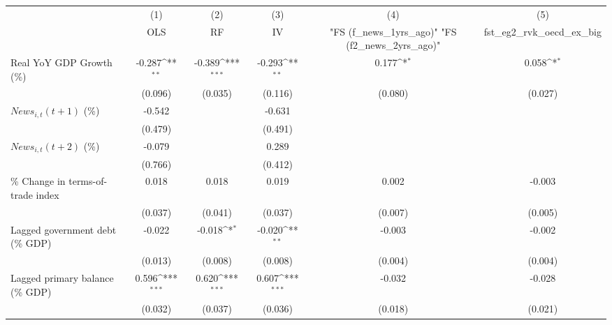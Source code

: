 {
\def\sym#1{\ifmmode^{#1}\else\(^{#1}\)\fi}
\begin{tabular}{l*{5}{c}}
\toprule
                    &\multicolumn{1}{c}{(1)}&\multicolumn{1}{c}{(2)}&\multicolumn{1}{c}{(3)}&\multicolumn{1}{c}{(4)}&\multicolumn{1}{c}{(5)}\\
                    &\multicolumn{1}{c}{OLS}&\multicolumn{1}{c}{RF}&\multicolumn{1}{c}{IV}&\multicolumn{1}{c}{ "FS (f_news_1yrs_ago)"  "FS (f2_news_2yrs_ago)" }&\multicolumn{1}{c}{fst_eg2_rvk_oecd_ex_big}\\
\midrule
Real YoY GDP Growth (\%)&      -0.287\sym{**} &      -0.389\sym{***}&      -0.293\sym{**} &       0.177\sym{*}  &       0.058\sym{*}  \\
                    &     (0.096)         &     (0.035)         &     (0.116)         &     (0.080)         &     (0.027)         \\
\addlinespace
$ News_{i,t}(t+1)$ (\%)&      -0.542         &                     &      -0.631         &                     &                     \\
                    &     (0.479)         &                     &     (0.491)         &                     &                     \\
\addlinespace
$ News_{i,t}(t+2)$ (\%)&      -0.079         &                     &       0.289         &                     &                     \\
                    &     (0.766)         &                     &     (0.412)         &                     &                     \\
\addlinespace
\% Change in terms-of-trade index&       0.018         &       0.018         &       0.019         &       0.002         &      -0.003         \\
                    &     (0.037)         &     (0.041)         &     (0.037)         &     (0.007)         &     (0.005)         \\
\addlinespace
Lagged government debt (\% GDP)&      -0.022         &      -0.018\sym{*}  &      -0.020\sym{**} &      -0.003         &      -0.002         \\
                    &     (0.013)         &     (0.008)         &     (0.008)         &     (0.004)         &     (0.004)         \\
\addlinespace
Lagged primary balance (\% GDP)&       0.596\sym{***}&       0.620\sym{***}&       0.607\sym{***}&      -0.032         &      -0.028         \\
                    &     (0.032)         &     (0.037)         &     (0.036)         &     (0.018)         &     (0.021)         \\

\end{tabular}}
